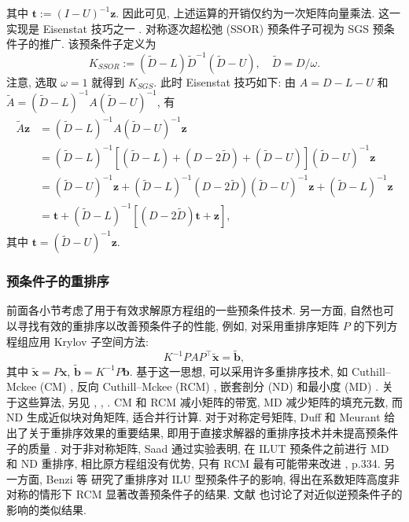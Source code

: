 {其中 $\bm t:=(I-U)^{-1}\bm z$. 因此可见, 上述运算的开销仅约为一次矩阵向量乘法. 这一实现是 Eisenstat 技巧之一 .}
{\leavevmode{}\label{idx:chapter-03-section-05:ssor-preconditioner}对称逐次超松弛 (SSOR) 预条件子可视为 SGS 预条件子的推广. 该预条件子定义为}
\[K_{SSOR}:=(\widetilde D-L)\widetilde D^{-1}(\widetilde D-U),\quad\widetilde D=D/\omega.\]
{注意, 选取 $\omega=1$ 就得到 $K_{SGS}$. 此时 Eisenstat 技巧如下: 由 $A=D-L-U$ 和 $\widetilde A=(\widetilde D-L)^{-1}A(\widetilde D-U)^{-1}$, 有}
\[\begin{aligned}\widetilde A\bm z&=(\widetilde D-L)^{-1}A(\widetilde D-U)^{-1}\bm z\\
&=(\widetilde D-L)^{-1}[(\widetilde D-L)+(D-2\widetilde D)+(\widetilde D-U)](\widetilde D-U)^{-1}\bm z\\
&=(\widetilde D-U)^{-1}\bm z+(\widetilde D-L)^{-1}(D-2\widetilde D)(\widetilde D-U)^{-1}\bm z+(\widetilde D-L)^{-1}\bm z\\
&=\bm t+(\widetilde D-L)^{-1}[(D-2\widetilde D)\bm t+\bm z],\end{aligned}\]
{其中 $\bm t=(\widetilde D-U)^{-1}\bm z$.}
\subsubsection{{预条件子的重排序}}\label{subsec:preconditioner-reorderings}
{前面各小节考虑了用于有效求解原方程组的一些预条件技术. 另一方面, 自然也可以寻找有效的重排序以改善预条件子的性能, 例如, 对采用重排序矩阵 $P$ 的下列方程组应用 Krylov 子空间方法:}
\[K^{-1}PAP^{\top}\widetilde{\bm x}=\widetilde{\bm b},\]
{其中 $\widetilde{\bm x}=P\bm x$, $\widetilde{\bm b}=K^{-1}P\bm b$. 基于这一思想, 可以采用许多重排序技术, 如 Cuthill--Mckee (CM) , 反向 Cuthill--Mckee (RCM) , 嵌套剖分 (ND)  和最小度 (MD) . 关于这些算法, 另见 , , . CM 和 RCM 减小矩阵的带宽, MD 减少矩阵的填充元数, 而 ND 生成近似块对角矩阵, 适合并行计算.}
{对于对称定号矩阵, Duff 和 Meurant 给出了关于重排序效果的重要结果, 即用于直接求解器的重排序技术并未提高预条件子的质量 .}
{对于非对称矩阵, Saad 通过实验表明, 在 ILUT 预条件之前进行 MD 和 ND 重排序, 相比原方程组没有优势, 只有 RCM 最有可能带来改进 , p.334. 另一方面, Benzi 等  研究了重排序对 ILU 型预条件子的影响, 得出在系数矩阵高度非对称的情形下 RCM 显著改善预条件子的结果. 文献  也讨论了对近似逆预条件子的影响的类似结果.}
